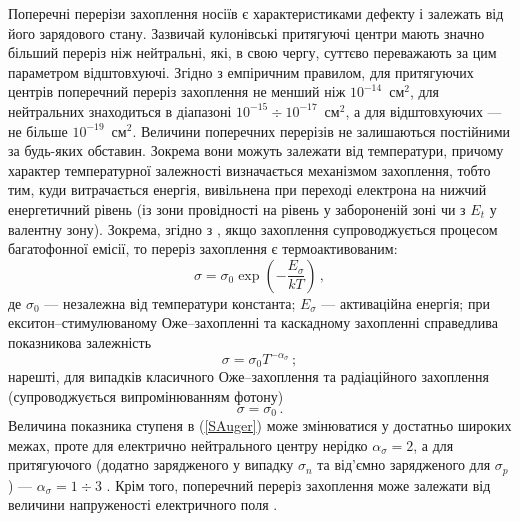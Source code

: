 Поперечні перерізи захоплення носіїв є характеристиками
дефекту і залежать від його зарядового стану.
Зазвичай кулонівські притягуючі центри мають значно більший переріз ніж нейтральні,
які, в свою чергу, суттєво переважають за цим параметром відштовхуючі.
Згідно з емпіричним правилом, для притягуючих центрів  поперечний переріз захоплення
не менший ніж $10^{-14}$~см$^2$,
для нейтральних знаходиться в діапазоні $10^{-15}\div10^{-17}$~см$^2$,
а для відштовхуючих --- не більше $10^{-19}$~см$^2$.
Величини поперечних перерізів не залишаються постійними за будь-яких обставин.
Зокрема вони можуть залежати від температури, причому
характер температурної залежності визначається механізмом захоплення,
тобто тим, куди витрачається енергія, вивільнена при переході електрона на нижчий енергетичний рівень
(із зони провідності на рівень у забороненій зоні чи з $E_t$ у валентну зону).
Зокрема, згідно з \cite{ROUGIEUX2018},
якщо захоплення супроводжується процесом багатофонної емісії, то
переріз захоплення є термоактивованим:
\begin{equation}
\label{Sta}
 \sigma=\sigma_0\exp\left(-\frac{E_{\sigma}}{kT}\right)\,,
\end{equation}
де
$\sigma_0$ --- незалежна від температури константа;
$E_{\sigma}$ --- активаційна енергія;
при екситон--стимулюваному Оже--захопленні та каскадному захопленні
справедлива показникова залежність
\begin{equation}
\label{SAuger}
 \sigma=\sigma_0 T^{-\alpha_{\sigma}}\,;
\end{equation}
нарешті, для випадків класичного Оже--захоплення та радіаційного
захоплення (супроводжується випромінюванням фотону)
\begin{equation}
\label{Sklas}
 \sigma=\sigma_0\,.
\end{equation}
Величина показника ступеня в (\ref{SAuger}) може змінюватися у достатньо широких
межах, проте для електрично нейтрального центру нерідко $\alpha_{\sigma}=2$,
а для притягуючого (додатно зарядженого у випадку $\sigma_n$
та від'ємно зарядженого для $\sigma_p$) --- $\alpha_{\sigma}=1\div3$ \cite{Sachenko2017}.
Крім того, поперечний переріз захоплення може залежати від величини напруженості електричного поля \cite{Shishiyanu,Bourgoin2001}.


